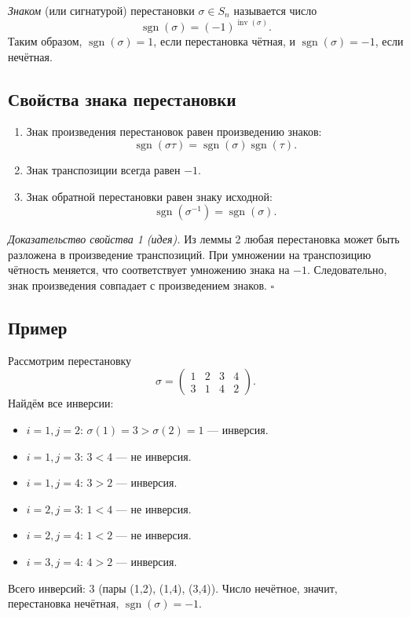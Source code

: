 \documentclass[a4paper,12pt]{article}
\theoremstyle{definition}
\theoremstyle{plain}
\theoremstyle{remark}
\begin{document}
	\begin{tcolorbox}[colback=purple!5, colframe=purple!50!black, title=Определение знака]
		\textit{Знаком} (или сигнатурой) перестановки \( \sigma \in S_n \) называется число
		\[
		\operatorname{sgn}(\sigma) = (-1)^{\operatorname{inv}(\sigma)}.
		\]
		Таким образом, \( \operatorname{sgn}(\sigma) = 1 \), если перестановка чётная, и \( \operatorname{sgn}(\sigma) = -1 \), если нечётная.
	\end{tcolorbox}
	
	\subsection{Свойства знака перестановки}
	
	\begin{enumerate}
		\item Знак произведения перестановок равен произведению знаков:
		\[
		\operatorname{sgn}(\sigma \tau) = \operatorname{sgn}(\sigma) \operatorname{sgn}(\tau).
		\]
		
		\item Знак транспозиции всегда равен \( -1 \).
		
		\item Знак обратной перестановки равен знаку исходной:
		\[
		\operatorname{sgn}(\sigma^{-1}) = \operatorname{sgn}(\sigma).
		\]
	\end{enumerate}
	
	\textit{Доказательство свойства 1 (идея).}
	Из леммы 2 любая перестановка может быть разложена в произведение транспозиций. При умножении на транспозицию чётность меняется, что соответствует умножению знака на \( -1 \). Следовательно, знак произведения совпадает с произведением знаков. \hfill \(\square\)
	
	\subsection{Пример}
	
	Рассмотрим перестановку
	\[
	\sigma = \begin{pmatrix}
		1 & 2 & 3 & 4 \\
		3 & 1 & 4 & 2
	\end{pmatrix}.
	\]
	Найдём все инверсии:
	\begin{itemize}
		\item \( i=1, j=2 \): \( \sigma(1)=3 > \sigma(2)=1 \) — инверсия.
		\item \( i=1, j=3 \): \( 3 < 4 \) — не инверсия.
		\item \( i=1, j=4 \): \( 3 > 2 \) — инверсия.
		\item \( i=2, j=3 \): \( 1 < 4 \) — не инверсия.
		\item \( i=2, j=4 \): \( 1 < 2 \) — не инверсия.
		\item \( i=3, j=4 \): \( 4 > 2 \) — инверсия.
	\end{itemize}
	Всего инверсий: 3 (пары (1,2), (1,4), (3,4)). Число нечётное, значит, перестановка нечётная, \( \operatorname{sgn}(\sigma) = -1 \).
	
\end{document}

